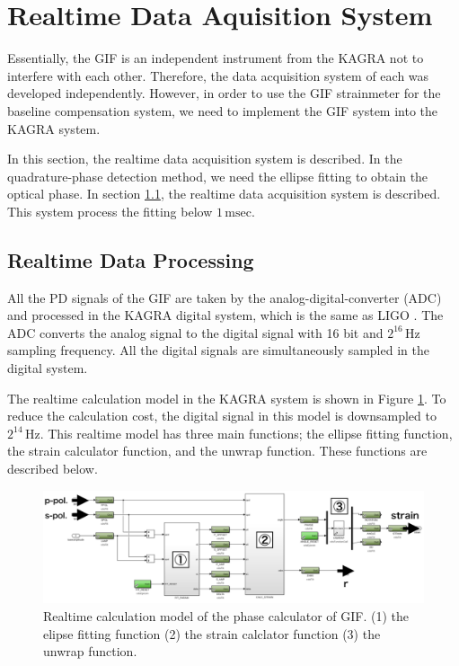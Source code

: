 \section{Realtime Data Aquisition System} \label{sec:sec44}
Essentially, the GIF is an independent instrument from the KAGRA not to interfere with each other. Therefore, the data acquisition system of each was developed independently. However, in order to use the GIF strainmeter for the baseline compensation system, we need to implement the GIF system into the KAGRA system. 

In this section, the realtime data acquisition system is described. In the quadrature-phase detection method, we need the ellipse fitting to obtain the optical phase. In section \cref{sec:142}, the realtime data acquisition system is described. This system process the fitting below $1\,\mathrm{msec}$.

\subsection{Realtime Data Processing} \label{sec:142}
All the PD signals of the GIF are taken by the analog-digital-converter (ADC) and processed in the KAGRA digital system, which is the same as LIGO \cite{bork2001overview}. The ADC converts the analog signal to the digital signal with 16 bit and $2^{16}\,\mathrm{Hz}$ sampling frequency. All the digital signals are simultaneously sampled in the digital system. 

The realtime calculation model in the KAGRA system is shown in Figure  \ref{img:img420}. To reduce the calculation cost, the digital signal in this model is downsampled to $2^{14}\,\mathrm{Hz}$. This realtime model has three main functions; the ellipse fitting function, the strain calculator function, and the unwrap function. These functions are described below.
\begin{figure}[h]
  \centering
  \includegraphics[width=15.0cm]{./img_chap4/img420.png}
  \caption{Realtime calculation model of the phase calculator of GIF. (1) the elipse fitting function (2) the strain calclator function (3) the unwrap function.}\label{img:img420}
\end{figure}


